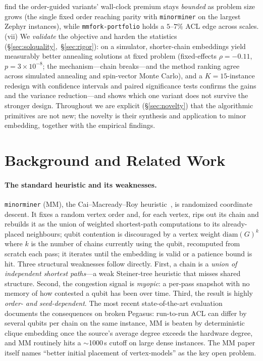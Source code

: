\documentclass[acmsmall,anonymous,nonacm]{acmart}
\begin{document}
find the order-guided variants' wall-clock premium stays \emph{bounded} as problem
size grows (the single fixed order reaching parity with \texttt{minorminer} on the
largest Zephyr instances), while \texttt{mmfork-portfolio} holds a $5$--$7\%$ ACL
edge across scales.
(vii) We \emph{validate} the objective and harden the statistics
(\S\ref{sec:solquality},~\S\ref{sec:rigor}): on a simulator, shorter-chain
embeddings yield measurably better annealing solutions at fixed problem
(fixed-effects $\rho=-0.11$, $p=3{\times}10^{-8}$; the mechanism---chain
breaks---and the method ranking agree across simulated annealing and spin-vector
Monte Carlo), and a $K{=}15$-instance redesign with confidence intervals
and paired significance tests confirms the gains and the variance reduction---and
shows which one variant does not survive the stronger design.
Throughout we are explicit (\S\ref{sec:novelty}) that the algorithmic primitives
are not new; the novelty is their synthesis and application to minor embedding,
together with the empirical findings.

\section{Background and Related Work}
\label{sec:related}

\paragraph{The standard heuristic and its weaknesses.}
\texttt{minorminer} (MM), the Cai--Macready--Roy heuristic~\cite{cai2014minorminer},
is randomized coordinate descent. It fixes a random vertex order and, for each
vertex, rips out its chain and rebuilds it as the union of weighted
shortest-path computations to its already-placed neighbours; qubit contention is
discouraged by a vertex weight $\mathrm{diam}(G)^{k}$ where $k$ is the number of
chains currently using the qubit, recomputed from scratch each pass; it iterates
until the embedding is valid or a patience bound is hit. Three structural
weaknesses follow directly. First, a chain is a \emph{union of independent
shortest paths}---a weak Steiner-tree heuristic that misses shared structure.
Second, the congestion signal is \emph{myopic}: a per-pass snapshot with no
memory of how contested a qubit has been over time. Third, the result is highly
\emph{order- and seed-dependent}. The most recent state-of-the-art
evaluation~\cite{gomez2025eval} documents the consequences on broken Pegasus:
run-to-run ACL can differ by several qubits per chain on the same instance, MM is
beaten by deterministic clique embedding once the source's average degree
exceeds the hardware degree, and MM routinely hits a $\sim$1000\,s cutoff on
large dense instances. The MM paper itself names ``better initial placement of
vertex-models'' as the key open problem.
\end{document}
